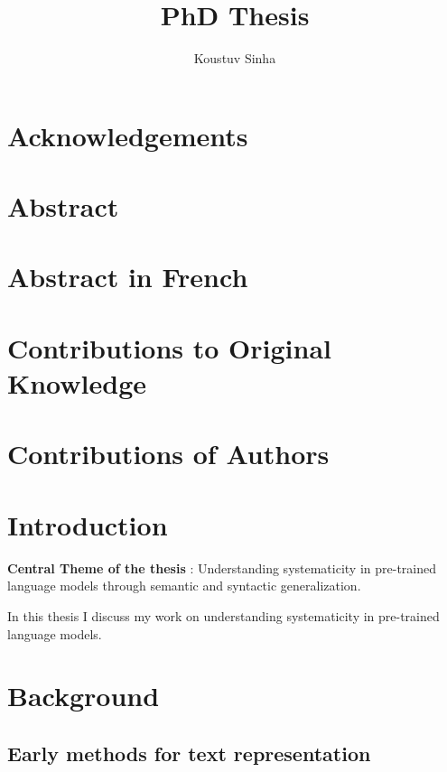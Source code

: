 \documentclass[letterpaper, 12pt]{report}
\author{Koustuv Sinha}
\date{}
\title{PhD Thesis}
\begin{document}
\maketitle
\raggedbottom
{}%
{}

\chapter*{Acknowledgements}
\label{sec:org111920c}
\chapter*{Abstract}
\label{sec:orgec62e8c}
\chapter*{Abstract in French}
\label{sec:org71795cd}
\chapter*{Contributions to Original Knowledge}
\label{sec:org3bc5b8a}
\chapter*{Contributions of Authors}
\label{sec:org2435b5a}

\listoffigures{}

\listoftables{}

\clearpage
\setcounter{tocdepth}{3}
\tableofcontents

\clearpage


\chapter{Introduction}
\label{sec:orgeb32902}

\textbf{\textbf{Central Theme of the thesis}} : Understanding systematicity in pre-trained language models through semantic and syntactic generalization.

In this thesis I discuss my work on understanding systematicity in pre-trained language models.

\clearpage

\chapter{Background}
\label{sec:orgaa03e11}

\section{Early methods for text representation}
\label{sec:org7176877}
\end{document}
